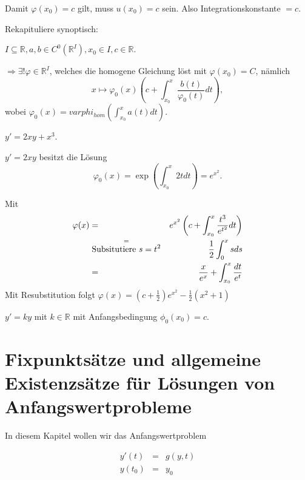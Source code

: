 \documentclass[10pt]{scrbook}
\begin{document}
Damit $\varphi(x_0)=c$ gilt, muss $u(x_0)=c$ sein. Also Integrationskonstante $= c$.

Rekapituliere synoptisch:

\begin{Sa}
$I\subseteq \mathbb{R}, a, b \in C^0(\mathbb{R}^I), x_0\in I, c\in\mathbb{R}$.

$\Rightarrow \exists ! \varphi\in\mathbb{R}^I$, welches die homogene Gleichung löst mit $\varphi(x_0)=C$, nämlich
\begin{displaymath}
x\mapsto \varphi_0(x)\left(c+\int_{x_0}^x \frac{b(t)}{\varphi_0(t)} dt\right),
\end{displaymath}
wobei $\varphi_0(x)=varphi_{hom}\left(\int_{x_0}^x a(t) dt\right)$.
\end{Sa}

\begin{Bsp}
$y'=2 x y +x^3$.

$y'=2 x y$ besitzt die Lösung
\begin{displaymath}
\varphi_0(x) = \exp\left(\int_{x_0}^x 2 t dt\right) = e^{x^2}.
\end{displaymath}

Mit
\begin{eqnarray*}
\varphi(x) & = & e^{x^2} \left(c+\int_{x_0}^x \frac{t^3}{e^{t^2}} dt\right) \\
& \stackrel{=}{\textnormal{Subsitutiere }s=t^2} & \frac{1}{2} \int_{0}^{x} s ds \\
& = & \frac{x}{e^x}+\int_{x_0}^x \frac{dt}{e^t}
\end{eqnarray*}
Mit Resubstitution folgt $\varphi(x)=(c+\frac{1}{2}) e^{x^2}-\frac{1}{2}\left(x^2+1\right)$
\end{Bsp}

\begin{Auf}
$y'=k y$ mit $k\in \mathbb{R}$ mit Anfangsbedingung $\phi_0(x_0)=c$.
\end{Auf}

\section{Fixpunktsätze und allgemeine Existenzsätze für Lösungen von Anfangswertprobleme}

In diesem Kapitel wollen wir das Anfangswertproblem

\begin{eqnarray}
y'(t) & = & g(y, t) \\
y(t_0) & = & y_0
\end{eqnarray}
\end{document}
